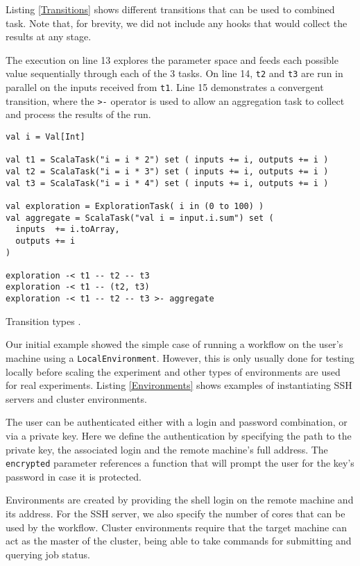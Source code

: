 Listing \ref{Transitions} shows different transitions that can be used to combined task. Note that, for brevity, we did not include any hooks that would collect the results at any stage. 

The execution on line 13 explores the parameter space and feeds each possible value sequentially through each of the 3 tasks. On line 14, \verb|t2| and \verb|t3| are run in parallel on the inputs received from \verb|t1|. Line 15 demonstrates a convergent transition, where the \verb|>-| operator is used to allow an aggregation task to collect and process the results of the run.

\begin{listing}[h]
	\centering
	\begin{minipage}{12.4cm}
		\begin{verbatim}
val i = Val[Int]

val t1 = ScalaTask("i = i * 2") set ( inputs += i, outputs += i )
val t2 = ScalaTask("i = i * 3") set ( inputs += i, outputs += i )
val t3 = ScalaTask("i = i * 4") set ( inputs += i, outputs += i )

val exploration = ExplorationTask( i in (0 to 100) )
val aggregate = ScalaTask("val i = input.i.sum") set (
  inputs  += i.toArray,
  outputs += i
)

exploration -< t1 -- t2 -- t3
exploration -< t1 -- (t2, t3)
exploration -< t1 -- t2 -- t3 >- aggregate
		\end{verbatim}
	\end{minipage}
	\caption{Transition types \cite{OpenMOLEDSL}.}
	\label{Transitions}
\end{listing}

Our initial example showed the simple case of running a workflow on the user's machine using a \verb|LocalEnvironment|. However, this is only usually done for testing locally before scaling the experiment and other types of environments are used for real experiments. Listing \ref{Environments} shows examples of instantiating SSH servers and cluster environments.

The user can be authenticated either with a login and password combination, or via a private key. Here we define the authentication by specifying the path to the private key, the associated login and the remote machine's full address. The \verb|encrypted| parameter references a function that will prompt the user for the key's password in case it is protected.

Environments are created by providing the shell login on the remote machine and its address. For the SSH server, we also specify the number of cores that can be used by the workflow. Cluster environments require that the target machine can act as the master of the cluster, being able to take commands for submitting and querying job status.


